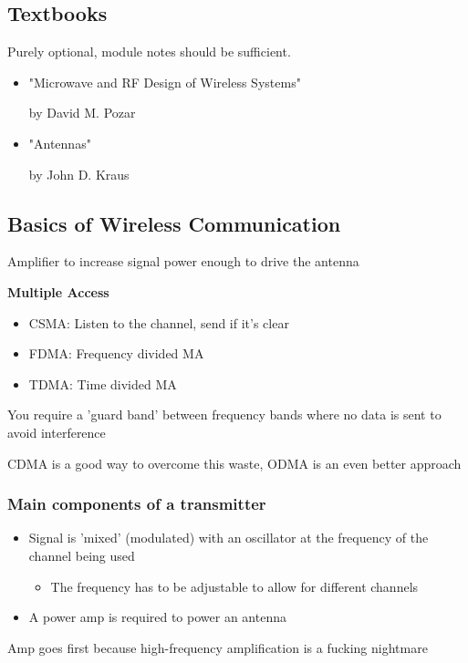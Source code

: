 \documentclass[12pt]{article}
\begin{document}
\subsection{Textbooks}
Purely optional, module notes should be sufficient.

\begin{itemize}[noitemsep]
    \item "Microwave and RF Design of Wireless Systems"

    by David M. Pozar
    \item "Antennas"

    by John D. Kraus
\end{itemize}

\begin{flushright}[Lecture on 1.3]\end{flushright}

\subsection{Basics of Wireless Communication}
Amplifier to increase signal power enough to drive the antenna

\textbf{Multiple Access}
\begin{itemize}[noitemsep]
\item CSMA: Listen to the channel, send if it's clear
\item FDMA: Frequency divided MA
\item TDMA: Time divided MA
\end{itemize}

You require a 'guard band' between frequency bands where no data is sent to avoid interference

CDMA is a good way to overcome this waste, ODMA is an even better approach

\subsubsection{Main components of a transmitter}
\begin{itemize}[noitemsep]
    \item Signal is 'mixed' (modulated) with an oscillator at the frequency of the channel being used
    \begin{itemize}[noitemsep]
        \item The frequency has to be adjustable to allow for different channels
    \end{itemize}
    \item A power amp is required to power an antenna
\end{itemize}
Amp goes first because high-frequency amplification is a fucking nightmare
\end{document}
